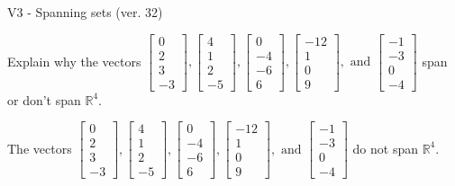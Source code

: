 \begin{exercise}
  \begin{exerciseTitle}V3 - Spanning sets (ver. 32)\end{exerciseTitle}
  \begin{exerciseStatement}
    Explain why the vectors \(\left[\begin{array}{r}
0 \\
2 \\
3 \\
-3
\end{array}\right] , \left[\begin{array}{r}
4 \\
1 \\
2 \\
-5
\end{array}\right] , \left[\begin{array}{r}
0 \\
-4 \\
-6 \\
6
\end{array}\right] , \left[\begin{array}{r}
-12 \\
1 \\
0 \\
9
\end{array}\right] , \text{ and } \left[\begin{array}{r}
-1 \\
-3 \\
0 \\
-4
\end{array}\right]\) span or don't span \(\mathbb{R}^4\). 
	


  \end{exerciseStatement}
  \begin{exerciseAnswer}
   The vectors \(\left[\begin{array}{r}
0 \\
2 \\
3 \\
-3
\end{array}\right] , \left[\begin{array}{r}
4 \\
1 \\
2 \\
-5
\end{array}\right] , \left[\begin{array}{r}
0 \\
-4 \\
-6 \\
6
\end{array}\right] , \left[\begin{array}{r}
-12 \\
1 \\
0 \\
9
\end{array}\right] , \text{ and } \left[\begin{array}{r}
-1 \\
-3 \\
0 \\
-4
\end{array}\right]\) 
  	 do not  
	span \(\mathbb{R}^4\).
  



\end{exerciseAnswer}
\end{exercise}
